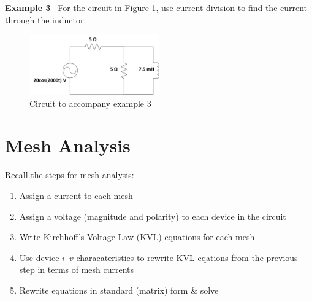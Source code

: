 \documentclass{handout}
\begin{document}
\textbf{Example 3}-- For the circuit in Figure \ref{fig: Example3}, use current division to find the current through the inductor.
\begin{figure} [h!]
\centering
\includegraphics[width=0.5\textwidth]{Example3.jpg}
\caption{Circuit to accompany example 3}
\label{fig: Example3}
\end{figure}


\newpage
\clearpage
\pagebreak

\section{Mesh Analysis}
Recall the steps for mesh analysis:
\begin{enumerate}
\item Assign a current to each mesh
\item Assign a voltage (magnitude and polarity) to each device in the circuit
\item Write Kirchhoff's Voltage Law (KVL) equations for each mesh
\item Use device $i$--$v$ characateristics to rewrite KVL eqations from the previous step in terms of mesh currents
\item Rewrite equations in standard (matrix) form \& solve
\end{enumerate}
\end{document}
